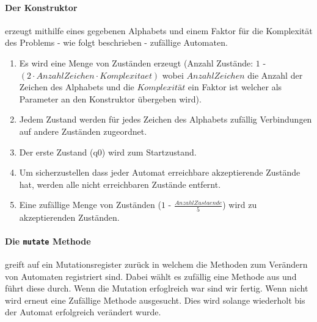 \paragraph{Der Konstruktor} erzeugt mithilfe eines gegebenen Alphabets und einem Faktor für die Komplexität des Problems - wie folgt beschrieben - zufällige Automaten.
\begin{enumerate}
  \item Es wird eine Menge von Zuständen erzeugt (Anzahl Zustände: $1$ - $(2 \cdot AnzahlZeichen \cdot Komplexitaet)$ wobei $AnzahlZeichen$ die Anzahl der Zeichen des Alphabets und die $Komplexität$ ein Faktor ist welcher als Parameter an den Konstruktor übergeben wird).
  \item Jedem Zustand werden für jedes Zeichen des Alphabets zufällig Verbindungen auf andere Zuständen zugeordnet.
  \item Der erste Zustand (q0) wird zum Startzustand.
  \item Um sicherzustellen dass jeder Automat erreichbare akzeptierende Zustände hat, werden alle nicht erreichbaren Zustände entfernt.
  \item Eine zufällige Menge von Zuständen ($1$ - $\frac{AnzahlZustaende}{5}$) wird zu akzeptierenden Zuständen.
\end{enumerate}


\paragraph{Die \lstinline$mutate$ Methode} greift auf ein Mutationsregister zurück in welchem die Methoden zum Verändern von Automaten registriert sind. Dabei wählt es zufällig eine Methode aus und führt diese durch. Wenn die Mutation erfoglreich war sind wir fertig. Wenn nicht wird erneut eine Zufällige Methode ausgesucht. Dies wird solange wiederholt bis der Automat erfolgreich verändert wurde.

